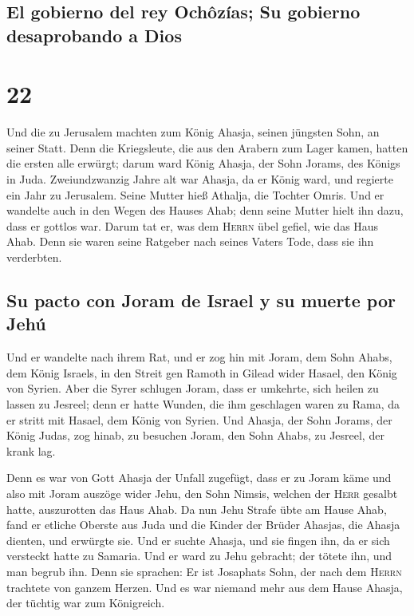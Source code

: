 \hypertarget{el-gobierno-del-rey-ochuxf4zuxedas-su-gobierno-desaprobando-a-dios}{%
\subsection{El gobierno del rey Ochôzías; Su gobierno desaprobando a
Dios}\label{el-gobierno-del-rey-ochuxf4zuxedas-su-gobierno-desaprobando-a-dios}}

\hypertarget{section-21}{%
\section{22}\label{section-21}}

 Und die zu Jerusalem machten zum König Ahasja, seinen
jüngsten Sohn, an seiner Statt. Denn die Kriegsleute, die aus den
Arabern zum Lager kamen, hatten die ersten alle erwürgt; darum ward
König Ahasja, der Sohn Jorams, des Königs in Juda. 
Zweiundzwanzig Jahre alt war Ahasja, da er König ward, und regierte ein
Jahr zu Jerusalem. Seine Mutter hieß Athalja, die Tochter Omris.
 Und er wandelte auch in den Wegen des Hauses Ahab; denn
seine Mutter hielt ihn dazu, dass er gottlos war.  Darum
tat er, was dem \textsc{Herrn} übel gefiel, wie das Haus Ahab. Denn sie
waren seine Ratgeber nach seines Vaters Tode, dass sie ihn verderbten.

\hypertarget{su-pacto-con-joram-de-israel-y-su-muerte-por-jehuxfa}{%
\subsection{Su pacto con Joram de Israel y su muerte por
Jehú}\label{su-pacto-con-joram-de-israel-y-su-muerte-por-jehuxfa}}

 Und er wandelte nach ihrem Rat, und er zog hin mit Joram,
dem Sohn Ahabs, dem König Israels, in den Streit gen Ramoth in Gilead
wider Hasael, den König von Syrien. Aber die Syrer schlugen Joram,
 dass er umkehrte, sich heilen zu lassen zu Jesreel; denn
er hatte Wunden, die ihm geschlagen waren zu Rama, da er stritt mit
Hasael, dem König von Syrien. Und Ahasja, der Sohn Jorams, der König
Judas, zog hinab, zu besuchen Joram, den Sohn Ahabs, zu Jesreel, der
krank lag.

 Denn es war von Gott Ahasja der Unfall zugefügt, dass er
zu Joram käme und also mit Joram auszöge wider Jehu, den Sohn Nimsis,
welchen der \textsc{Herr} gesalbt hatte, auszurotten das Haus Ahab.
 Da nun Jehu Strafe übte am Hause Ahab, fand er etliche
Oberste aus Juda und die Kinder der Brüder Ahasjas, die Ahasja dienten,
und erwürgte sie.  Und er suchte Ahasja, und sie fingen
ihn, da er sich versteckt hatte zu Samaria. Und er ward zu Jehu
gebracht; der tötete ihn, und man begrub ihn. Denn sie sprachen: Er ist
Josaphats Sohn, der nach dem \textsc{Herrn} trachtete von ganzem Herzen.
Und es war niemand mehr aus dem Hause Ahasja, der tüchtig war zum
Königreich.

